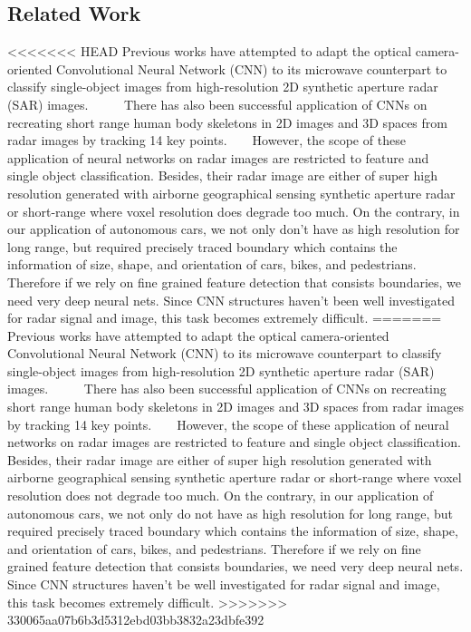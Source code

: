 \subsection{Related Work}
<<<<<<< HEAD
Previous works have attempted to adapt the optical camera-oriented Convolutional Neural Network (CNN) to its microwave counterpart to classify single-object images from high-resolution 2D synthetic aperture radar (SAR) images. ~\cite{SAR_DL} ~\cite{ship_SAR} ~\cite{change_SAR} There has also been successful application of CNNs on recreating short range human body skeletons in 2D images and 3D spaces from radar images by tracking 14 key points. ~\cite{rfpose} ~\cite{rfpose3D} However, the scope of these application of neural networks on radar images are restricted to feature and single object classification. Besides, their radar image are either of super high resolution generated with airborne geographical sensing synthetic aperture radar or short-range where voxel resolution does degrade too much. On the contrary, in our application of autonomous cars, we not only don't have as high resolution for long range, but required precisely traced boundary which contains the information of size, shape, and orientation of cars, bikes, and pedestrians. Therefore if we rely on fine grained feature detection that consists boundaries, we need very deep neural nets. Since CNN structures haven't been well investigated for radar signal and image, this task becomes extremely difficult.
=======
Previous works have attempted to adapt the optical camera-oriented Convolutional Neural Network (CNN) to its microwave counterpart to classify single-object images from high-resolution 2D synthetic aperture radar (SAR) images. ~\cite{SAR_DL} ~\cite{ship_SAR} ~\cite{change_SAR} There has also been successful application of CNNs on recreating short range human body skeletons in 2D images and 3D spaces from radar images by tracking 14 key points. ~\cite{rfpose} ~\cite{rfpose3D} However, the scope of these application of neural networks on radar images are restricted to feature and single object classification. Besides, their radar image are either of super high resolution generated with airborne geographical sensing synthetic aperture radar or short-range where voxel resolution does not degrade too much. On the contrary, in our application of autonomous cars, we not only do not have as high resolution for long range, but required precisely traced boundary which contains the information of size, shape, and orientation of cars, bikes, and pedestrians. Therefore if we rely on fine grained feature detection that consists boundaries, we need very deep neural nets. Since CNN structures haven't be well investigated for radar signal and image, this task becomes extremely difficult.      
>>>>>>> 330065aa07b6b3d5312ebd03bb3832a23dbfe392

